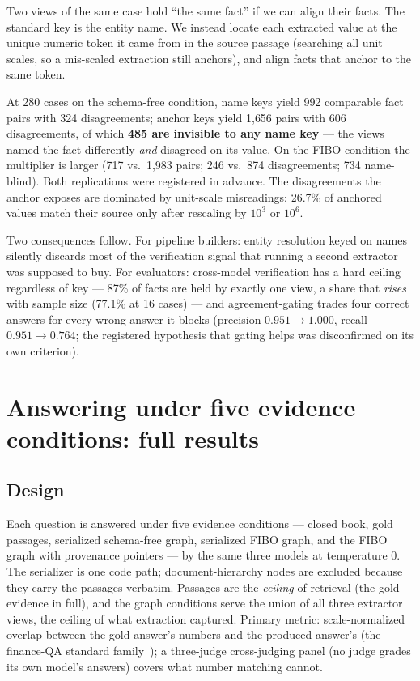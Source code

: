 \documentclass{article}
\begin{document}
Two views of the same case hold ``the same fact'' if we can align their
facts. The standard key is the entity name. We instead locate each extracted
value at the unique numeric token it came from in the source passage
(searching all unit scales, so a mis-scaled extraction still anchors), and
align facts that anchor to the same token.

At 280 cases on the schema-free condition, name keys yield 992 comparable
fact pairs with 324 disagreements; anchor keys yield 1{,}656 pairs with 606
disagreements, of which \textbf{485 are invisible to any name key} --- the
views named the fact differently \emph{and} disagreed on its value. On the
FIBO condition the multiplier is larger (717 vs.\ 1{,}983 pairs; 246 vs.\
874 disagreements; 734 name-blind). Both replications were registered in
advance. The disagreements the anchor exposes are dominated by unit-scale
misreadings: 26.7\% of anchored values match their source only after
rescaling by $10^3$ or $10^6$.

Two consequences follow. For pipeline builders: entity resolution keyed on
names silently discards most of the verification signal that running a
second extractor was supposed to buy. For evaluators: cross-model
verification has a hard ceiling regardless of key --- 87\% of facts are held
by exactly one view, a share that \emph{rises} with sample size (77.1\% at
16 cases) --- and agreement-gating trades four correct answers for every
wrong answer it blocks (precision $0.951 \to 1.000$, recall $0.951 \to
0.764$; the registered hypothesis that gating helps was disconfirmed on its
own criterion).

\section{Answering under five evidence conditions: full results}\label{app:part2}

\subsection{Design}

Each question is answered under five evidence conditions --- closed book,
gold passages, serialized schema-free graph, serialized FIBO graph, and the
FIBO graph with provenance pointers --- by the same three models at
temperature 0. The serializer is one code path; document-hierarchy nodes are
excluded because they carry the passages verbatim. Passages are the
\emph{ceiling} of retrieval (the gold evidence in full), and the graph
conditions serve the union of all three extractor views, the ceiling of what
extraction captured. Primary metric: scale-normalized overlap between the
gold answer's numbers and the produced answer's (the finance-QA standard
family~\citep{finqa,tatqa}); a three-judge cross-judging panel (no judge
grades its own model's answers) covers what number matching cannot.
\end{document}
